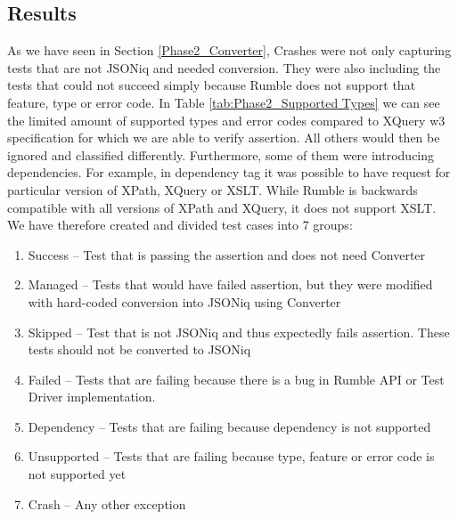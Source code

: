 \subsection{Results}
As we have seen in Section \ref{Phase2_Converter}, Crashes were not only capturing tests that are not JSONiq and needed conversion. They were also including the tests that could not succeed simply because Rumble does not support that feature, type or error code. In Table \ref{tab:Phase2_Supported Types} we can see the limited amount of supported types and error codes compared to XQuery w3 specification for which we are able to verify assertion. All others would then be ignored and classified differently. Furthermore, some of them were introducing dependencies. For example, in dependency tag it was possible to have request for particular version of XPath, XQuery or XSLT. While Rumble is backwards compatible with all versions of XPath and XQuery, it does not support XSLT. We have therefore created and divided test cases into 7 groups:
\begin{enumerate}
	\item Success – Test that is passing the assertion and does not need Converter
	\item Managed – Tests that would have failed assertion, but they were modified with hard-coded conversion into JSONiq using Converter
	\item Skipped – Test that is not JSONiq and thus expectedly fails assertion. These tests should not be converted to JSONiq
	\item Failed – Tests that are failing because there is a bug in Rumble API or Test Driver implementation. 
	\item Dependency – Tests that are failing because dependency is not supported
	\item Unsupported – Tests that are failing because type, feature or error code is not supported yet
	\item Crash – Any other exception
\end{enumerate}

